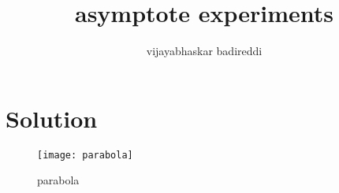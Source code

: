 \documentclass[12pt]{article}
\title{asymptote experiments}
\author{vijayabhaskar badireddi}
\begin{document}
\section*{Solution}
\begin{figure}[htb]
\begin{center}
\texttt{[image: parabola]}
\caption{parabola}
\end{center}
\end{figure}
\end{document}
